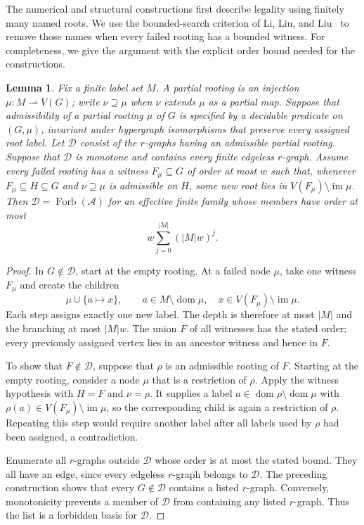 \documentclass[10pt]{article}
\numberwithin{equation}{section}
\newtheorem{lemma}[lemma]{Lemma}\aliascntresetthe{lemma}
\theoremstyle{definition}
\newcommand{\cA}{\mathcal A}\newcommand{\cB}{\mathcal B}\newcommand{\cC}{\mathcal C}
\newcommand{\cD}{\mathcal D}\newcommand{\cE}{\mathcal E}\newcommand{\cF}{\mathcal F}
\newcommand{\Forb}{\operatorname{Forb}}\newcommand{\Ext}{\operatorname{Ext}}
\begin{document}
The numerical and structural constructions first describe legality using finitely many named roots. We use the bounded-search criterion of Li, Liu, and Liu~\cite[Lemmas 8.3--8.4]{LiLiuLiu2026} to remove those names when every failed rooting has a bounded witness. For completeness, we give the argument with the explicit order bound needed for the constructions.
\begin{lemma}\label{lem:unroot}
Fix a finite label set $M$. A \emph{partial rooting} is an injection $\mu\colon M\rightharpoonup V(G)$; write $\nu\supseteq\mu$ when $\nu$ extends $\mu$ as a partial map. Suppose that admissibility of a partial rooting $\mu$ of $G$ is specified by a decidable predicate on $(G,\mu)$, invariant under hypergraph isomorphisms that preserve every assigned root label. Let $\cD$ consist of the $r$-graphs having an admissible partial rooting. Suppose that $\cD$ is monotone and contains every finite edgeless $r$-graph. Assume every failed rooting has a witness $F_\mu\subseteq G$ of order at most $w$ such that, whenever $F_\mu\subseteq H\subseteq G$ and $\nu\supseteq\mu$ is admissible on $H$, some new root lies in $V(F_\mu)\setminus\operatorname{im}\mu$. Then $\cD=\Forb(\cA)$ for an effective finite family whose members have order at most
\[
 w\sum_{j=0}^{|M|}(|M|w)^j.
\]
\end{lemma}
\begin{proof}
In $G\notin\cD$, start at the empty rooting. At a failed node $\mu$, take one witness $F_\mu$ and create the children
\[
 \mu\cup\{a\mapsto x\},\qquad
 a\in M\setminus\operatorname{dom}\mu,\quad
 x\in V(F_\mu)\setminus\operatorname{im}\mu.
\]
Each step assigns exactly one new label. The depth is therefore at most $|M|$ and the branching at most $|M|w$. The union $F$ of all witnesses has the stated order; every previously assigned vertex lies in an ancestor witness and hence in $F$.

To show that $F\notin\cD$, suppose that $\rho$ is an admissible rooting of $F$. Starting at the empty rooting, consider a node $\mu$ that is a restriction of $\rho$. Apply the witness hypothesis with $H=F$ and $\nu=\rho$. It supplies a label $a\in\operatorname{dom}\rho\setminus\operatorname{dom}\mu$ with $\rho(a)\in V(F_\mu)\setminus\operatorname{im}\mu$, so the corresponding child is again a restriction of $\rho$. Repeating this step would require another label after all labels used by $\rho$ had been assigned, a contradiction.

Enumerate all $r$-graphs outside $\cD$ whose order is at most the stated bound. They all have an edge, since every edgeless $r$-graph belongs to $\cD$. The preceding construction shows that every $G\notin\cD$ contains a listed $r$-graph. Conversely, monotonicity prevents a member of $\cD$ from containing any listed $r$-graph. Thus the list is a forbidden basis for $\cD$.
\end{proof}
\end{document}
